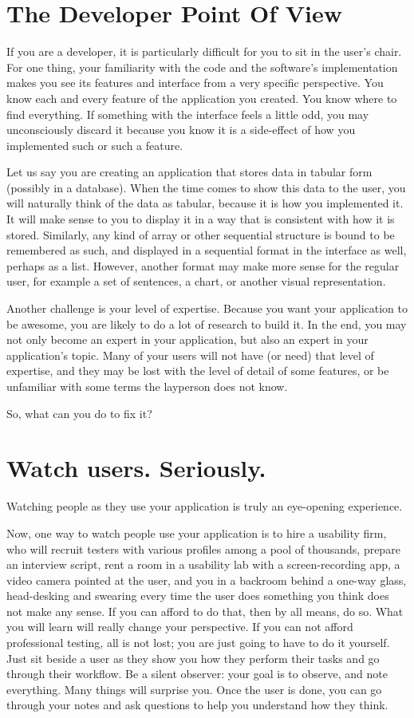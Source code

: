 \section*{The Developer Point Of View}

If you are a developer, it is particularly difficult for you to sit in the user's chair. For one
thing, your familiarity with the code and the software's implementation makes
you see its features and interface from a very specific perspective. You
know each and every feature of the application you created. You know where to
find everything. If something with the interface feels a little odd, you may
unconsciously discard it because you know it is a side-effect of how you
implemented such or such a feature.

Let us say you are creating an application that stores data in tabular form
(possibly in a database). When the time comes to show this data to the user, you
will naturally think of the data as tabular, because it is how you implemented
it. It will make sense to you to display it in a way that is consistent with how
it is stored. Similarly, any kind of array or other sequential structure is
bound to be remembered as such, and displayed in a sequential format in the
interface as well, perhaps as a list. However, another format may make more
sense for the regular user, for example a set of sentences, a chart, or another
visual representation.

Another challenge is your level of expertise. Because you want your
application to be awesome, you are likely to do a lot of research to build it.
In the end, you may not only become an expert in your application, but also an
expert in your application's topic. Many of your users will not have (or need)
that level of expertise, and they may be lost with the level of detail of some
features, or be unfamiliar with some terms the layperson does not know.

So, what can you do to fix it?

\section*{Watch users. Seriously.}

Watching people as they use your application is truly an eye-opening experience.

Now, one way to watch people use your application is to hire a usability firm,
who will recruit testers with various profiles among a pool of thousands,
prepare an interview script, rent a room in a usability lab with a
screen-recording app, a video camera pointed at the user, and you in a
backroom behind a one-way glass, head-desking and swearing every time the user
does something you think does not make any sense. If you can afford to do that,
then by all means, do so. What you will learn will really change your
perspective. If you can not afford professional testing, all is not lost; you
are just going to have to do it yourself. Just sit beside a user as they show
you how they perform their tasks and go through their workflow. Be a silent
observer: your goal is to observe, and note everything. Many things will
surprise you. Once the user is done, you can go through your notes and ask
questions to help you understand how they think.

